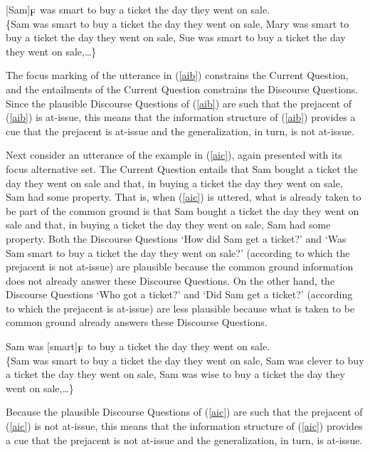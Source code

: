 \documentclass[11pt,fleqn]{article}
\newcommand{\foc}{$_{\mbox{\small F}}$}
\newcommand{\6}{\mbox{$[\hspace*{-.6mm}[$}}
\newcommand{\9}{\mbox{$]\hspace*{-.6mm}]$}}
\begin{document}
\begin{exe}
\ex\label{aib} {[}Sam]\foc{} was smart to buy a ticket the day they went on sale.
\\ \{Sam was smart to buy a ticket the day they went on sale, Mary was smart to buy a ticket the day they went on sale, Sue was smart to buy a ticket the day they went on sale,\ldots\}
\end{exe}
The focus marking of the utterance in (\ref{aib}) constrains the Current Question, and the entailments of the Current Question constrains the Discourse Questions. Since the plausible Discourse Questions of (\ref{aib}) are such that the prejacent of (\ref{aib}) is at-issue, this means that the information structure of (\ref{aib}) provides a cue that the prejacent is at-issue and the generalization, in turn, is not at-issue.

Next consider an utterance of the example in (\ref{aic}), again presented with its focus alternative set. The Current Question entails that Sam bought a ticket the day they went on sale and that, in buying a ticket the day they went on sale, Sam had some property. That is, when (\ref{aic}) is uttered, what is already taken to be part of the common ground is that Sam bought a ticket the day they went on sale and that, in buying a ticket the day they went on sale, Sam had some property. Both the Discourse Questions `How did Sam get a ticket?' and `Was Sam smart to buy a ticket the day they went on sale?' (according to which the prejacent is not at-issue) are plausible because the common ground information does not already answer these Discourse Questions. On the other hand, the Discourse Questions `Who got a ticket?' and `Did Sam get a ticket?' (according to which the prejacent is at-issue) are less plausible because what is taken to be common ground already answers these Discourse Questions. 

\begin{exe}
\ex\label{aic} Sam was [smart]\foc{} to buy a ticket the day they went on sale.
\\ \{Sam was smart to buy a ticket the day they went on sale, Sam was clever to buy a ticket the day they went on sale, Sam was wise to buy a ticket the day they went on sale,\ldots\}
\end{exe}
Because the plausible Discourse Questions of (\ref{aic}) are such that the prejacent of (\ref{aic}) is not at-issue, this means that the information structure of (\ref{aic}) provides a cue that the prejacent is not at-issue and the generalization, in turn, is at-issue.
\end{document}
